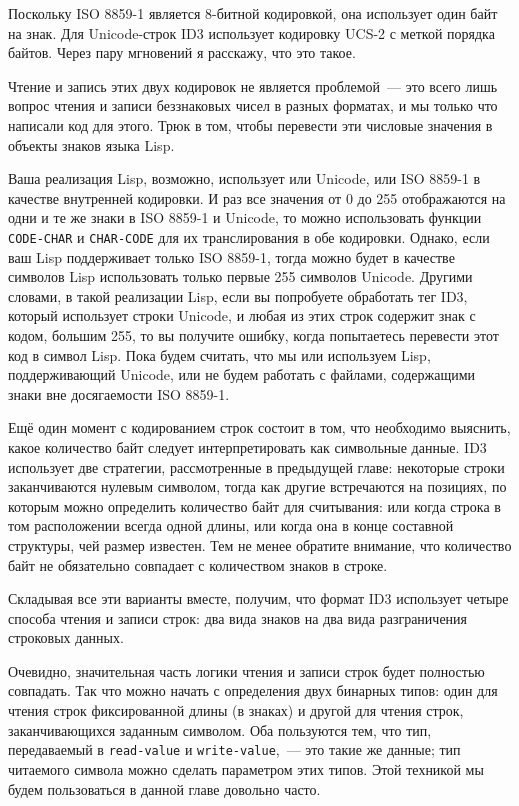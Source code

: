 Поскольку ISO 8859-1 является 8-битной кодировкой, она использует один байт на
знак. Для Unicode-строк ID3 использует кодировку UCS-2 с меткой порядка байтов. Через пару мгновений я расскажу, что это такое.

Чтение и запись этих двух кодировок не является проблемой~--- это всего лишь вопрос чтения
и записи беззнаковых чисел в разных форматах, и мы только что написали код для этого.
Трюк в том, чтобы перевести эти числовые значения в объекты знаков языка Lisp.

Ваша реализация Lisp, возможно, использует или Unicode, или ISO 8859-1 в качестве внутренней
кодировки.  И раз все значения от 0 до 255 отображаются на одни и те же знаки в ISO 8859-1
и Unicode, то можно использовать функции \lstinline{CODE-CHAR} и \lstinline{СHAR-CODE} для их транслирования в обе
кодировки.  Однако, если ваш Lisp поддерживает только ISO 8859-1, тогда можно будет
в качестве символов Lisp использовать только первые 255 символов Unicode. Другими словами, в
такой реализации Lisp, если вы попробуете обработать тег ID3, который использует строки
Unicode, и любая из этих строк содержит знак с кодом, большим 255, то вы получите ошибку,
когда попытаетесь перевести этот код в символ Lisp.  Пока будем считать, что мы
или используем Lisp, поддерживающий Unicode, или не будем работать с файлами, содержащими
знаки вне досягаемости ISO 8859-1.

Ещё один момент с кодированием строк состоит в том, что необходимо выяснить, какое количество
байт следует интерпретировать как символьные данные. 
ID3 использует две стратегии, рассмотренные в предыдущей главе: некоторые
строки заканчиваются нулевым символом, тогда как другие встречаются на позициях, по
которым можно определить количество байт для считывания: или когда строка в том
расположении всегда одной длины, или когда она в конце составной структуры, чей размер
известен.  Тем не менее обратите внимание, что количество байт не обязательно совпадает с
количеством знаков в строке.

Складывая все эти варианты вместе, получим, что формат ID3 использует четыре способа
чтения и записи строк: два вида знаков на два вида разграничения строковых данных.

Очевидно, значительная часть логики чтения и записи строк будет полностью совпадать.  Так
что можно начать с определения двух бинарных типов: один для чтения строк фиксированной длины
(в знаках) и другой для чтения строк, заканчивающихся заданным символом.  
Оба пользуются тем, что тип, передаваемый в \lstinline{read-value} и \lstinline{write-value},~---
это такие же данные; тип читаемого символа можно сделать параметром
этих типов. Этой техникой мы будем пользоваться в данной главе довольно часто.

